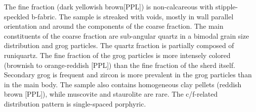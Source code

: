 \documentclass[a4paper]{article}
\begin{document}
\begin{multicols}{2}
\noindent The  fine fraction (dark yellowish brown[PPL]) is non-calcareous with stipple-speckled b-fabric. The sample is streaked with voids, mostly in wall parallel orientation and around the components of the coarse fraction. The main constituents of the coarse fraction are sub-angular quartz in a bimodal grain size distribution and grog particles. The quartz fraction is partially composed of runiquartz. The fine fraction of the grog particles is more intensely colored (brownish to orange-reddish [PPL]) than the fine fraction of the sherd itself. Secondary grog is frequent and zircon is more prevalent in the grog particles than in the main body. The sample also contains homogeneous clay pellets (reddish brown [PPL]), while muscovite and staurolite are rare. The c/f-related distribution pattern is single-spaced porphyric.
\end{multicols}
\end{document}
